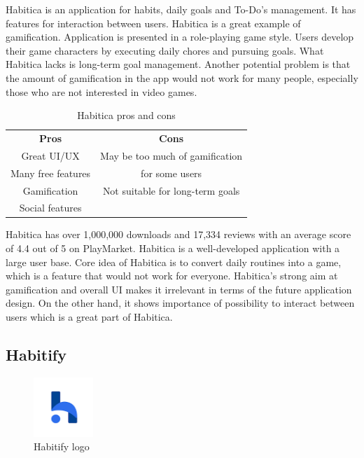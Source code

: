 Habitica is an application for habits, daily goals and To-Do's management.
It has features for interaction between users.
Habitica is a great example of gamification.
Application is presented in a role-playing game style.
Users develop their game characters by executing daily chores and pursuing goals.
What Habitica lacks is long-term goal management.
Another potential problem is that the amount of gamification in the app would not work for many people,
especially those who are not interested in video games.

\begin{table}[h!]
    \centering
    \begin{ctucolortab}
        \begin{tabular}{cc}
            \bfseries Pros & \bfseries Cons\\\Midrule
            Great UI/UX & May be too much of gamification \\
            Many free features & for some users \\
            Gamification & Not suitable for long-term goals \\
            Social features & \\
        \end{tabular}
    \end{ctucolortab}
    \caption{Habitica pros and cons}\label{tab:habitica-pros-cons}
\end{table}

Habitica has over 1,000,000 downloads and 17,334 reviews with an average score of 4.4 out of 5 on PlayMarket.
Habitica is a well-developed application with a large user base.
Core idea of Habitica is to convert daily routines into a game, which is a feature that would not work for everyone.
Habitica's strong aim at gamification and overall UI makes it irrelevant in terms of the future application design.
On the other hand, it shows importance of possibility to interact between users which is a great part of Habitica.


\subsection{Habitify}\label{subsec:habitify}

\begin{figure}[h!]
    \includegraphics[width=0.20\textwidth]{images/habitify-logo}
    \caption{Habitify logo~\cite{habitify-logo}}
    \label{fig:habitify-logo}
\end{figure}

